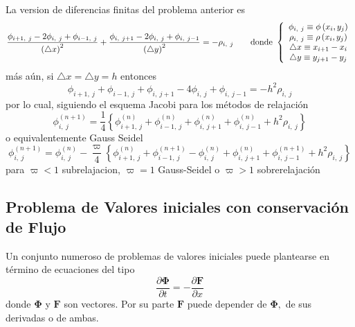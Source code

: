 \documentclass[spanish,titlepage,11pt]{article}
\begin{document}
La version de diferencias finitas del problema anterior es
\[
\dfrac{\phi_{i+1,\ j}-2\phi_{i,\ j}+\phi_{i-1,\ j}}{\left(  \triangle
x\right)  ^{2}}+\dfrac{\phi_{i,\ j+1}-2\phi_{i,\ j}+\phi_{i,\ j-1}}{\left(
\triangle y\right)  ^{2}}=-\rho_{i,\ j}\qquad\mathrm{donde\ }\left\{
\begin{array}
[c]{c}%
\phi_{i,\ j}\equiv\phi\left(  x_{i},y_{j}\right) \\
\rho_{i,\ j}\equiv\rho\left(  x_{i},y_{j}\right) \\
\triangle x\equiv x_{i+1}-x_{i}\\
\triangle y\equiv y_{j+1}-y_{j}%
\end{array}
\right.
\]
m\'{a}s a\'{u}n, si $\triangle x=\triangle y=h$ entonces
\[
\phi_{i+1,\ j}+\phi_{i-1,\ j}+\phi_{i,\ j+1}-4\phi_{i,\ j}+\phi_{i,\ j-1}%
=-h^{2}\rho_{i,\ j}
\]
por lo cual, siguiendo el esquema Jacobi para los m\'{e}todos de
relajaci\'{o}n
\[
\phi_{i,\ j}^{(n+1)}=\dfrac{1}{4}\left\{  \phi_{i+1,\ j}^{\left(  n\right)
}+\phi_{i-1,\ j}^{\left(  n\right)  }+\phi_{i,\ j+1}^{\left(  n\right)  }%
+\phi_{i,\ j-1}^{\left(  n\right)  }+h^{2}\rho_{i,\ j}\right\}
\]
o equivalentemente Gauss Seidel
\[
\phi_{i,\ j}^{(n+1)}=\phi_{i,\ j}^{(n)}-\dfrac{\varpi}{4}\left\{
\phi_{i+1,\ j}^{\left(  n\right)  }+\phi_{i-1,\ j}^{\left(  n+1\right)  }%
-\phi_{i,\ j}^{(n)}+\phi_{i,\ j+1}^{\left(  n\right)  }+\phi_{i,\ j-1}%
^{\left(  n+1\right)  }+h^{2}\rho_{i,\ j}\right\}
\]
para $\varpi<1$ subrelajacion, $\varpi=1$ Gauss-Seidel o $\varpi>1$
sobrerelajaci\'{o}n

\subsection{Problema de Valores iniciales con conservaci\'{o}n de Flujo}

Un conjunto numeroso de problemas de valores iniciales puede plantearse en
t\'{e}rmino de ecuaciones del tipo
\[
\dfrac{\partial\mathbf{\Phi}}{\partial t}=-\dfrac{\partial\mathbf{F}}{\partial
x}
\]
donde $\mathbf{\Phi}$ y $\mathbf{F}$ son vectores. Por su parte $\mathbf{F}$
puede depender de $\mathbf{\Phi,}$ de sus derivadas o de ambas.
\end{document}
